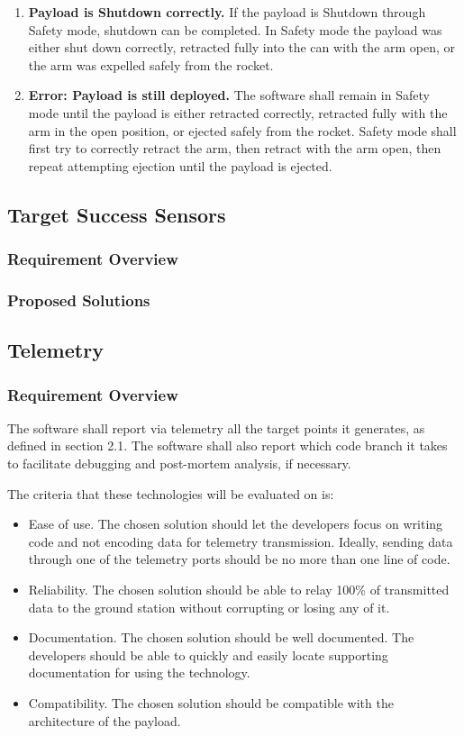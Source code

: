 \documentclass[letterpaper,10pt]{article}
\begin{document}
\begin{center}
\begin{enumerate}
\item{\textbf{Payload is Shutdown correctly.} If the payload is Shutdown through Safety mode, shutdown can be completed. In Safety mode the payload was either shut down correctly, retracted fully into the can with the arm open, or the arm was expelled safely from the rocket.}
\item{\textbf{Error: Payload is still deployed.} The software shall remain in Safety mode until the payload is either retracted correctly, retracted fully with the arm in the open position, or ejected safely from the rocket. Safety mode shall first try to correctly retract the arm, then retract with the arm open, then repeat attempting ejection until the payload is ejected.}
\end{enumerate}
\end{center}

\subsection{Target Success Sensors}
\subsubsection{Requirement Overview}
\subsubsection{Proposed Solutions}

\subsection{Telemetry}
\subsubsection{Requirement Overview}
The software shall report via telemetry all the target points it generates,
as defined in section 2.1.
The software shall also report which code branch it takes to facilitate debugging and
post-mortem analysis, if necessary.

The criteria that these technologies will be evaluated on is:
\begin{itemize}
\item Ease of use.
The chosen solution should let the developers focus on writing code and not encoding data for telemetry transmission.
Ideally, sending data through one of the telemetry ports should be no more than one line of code. 
\item Reliability.
The chosen solution should be able to relay 100\% of transmitted data to the ground station without corrupting or losing any of it.
\item Documentation.
The chosen solution should be well documented.
The developers should be able to quickly and easily locate supporting documentation for using the technology.
\item Compatibility.
The chosen solution should be compatible with the architecture of the \gls{payload}.
\end{itemize}
\end{document}
